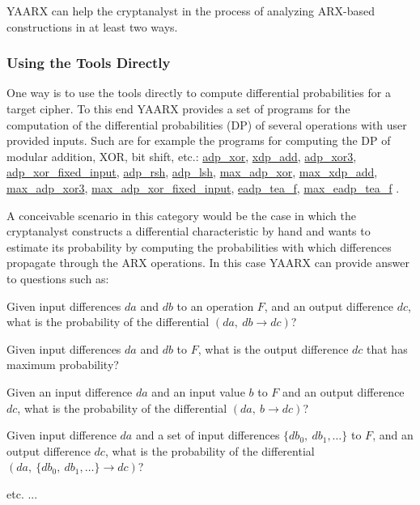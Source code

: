 \-Y\-A\-A\-R\-X can help the cryptanalyst in the process of analyzing \-A\-R\-X-\/based constructions in at least two ways.\hypertarget{index_scenario1_sec}{}\subsubsection{\-Using the Tools Directly}\label{index_scenario1_sec}
\-One way is to use the tools directly to compute differential probabilities for a target cipher. \-To this end \-Y\-A\-A\-R\-X provides a set of programs for the computation of the differential probabilities (\-D\-P) of several operations with user provided inputs. \-Such are for example the programs for computing the \-D\-P of modular addition, \-X\-O\-R, bit shift, etc.\-: \hyperlink{adp-xor_8hh_ac720722a292fc8bb277b751e0b0be072}{adp\-\_\-xor}, \hyperlink{xdp-add_8hh_a25473697bd215fe5eb997574be30e6f3}{xdp\-\_\-add}, \hyperlink{adp-xor3_8hh_a980a22f6faf155e031f0d9f7e8ca9361}{adp\-\_\-xor3}, \hyperlink{adp-xor-fi_8hh_a99d9ef4f2707e61bbd739aa41c93dcb4}{adp\-\_\-xor\-\_\-fixed\-\_\-input}, \hyperlink{adp-shift_8hh_a06fffd781af6662482922889bc562caf}{adp\-\_\-rsh}, \hyperlink{adp-shift_8hh_a48f94900b0d370c44ef16256310d073f}{adp\-\_\-lsh}, \hyperlink{max-adp-xor_8hh_aa66f59ae4d29988f90f525ce600d6045}{max\-\_\-adp\-\_\-xor}, \hyperlink{max-xdp-add_8hh_a19d57935afe7dabc0628a3ea44c1f135}{max\-\_\-xdp\-\_\-add}, \hyperlink{max-adp-xor3_8hh_aa606808c54de33ad16170106454312a7}{max\-\_\-adp\-\_\-xor3}, \hyperlink{max-adp-xor-fi_8hh_ab2a3ba6507c5a4b456487c3f8009511b}{max\-\_\-adp\-\_\-xor\-\_\-fixed\-\_\-input}, \hyperlink{eadp-tea-f_8hh_a2b46cad5e0dd22f116160ef8fde6e15f}{eadp\-\_\-tea\-\_\-f}, \hyperlink{eadp-tea-f_8hh_afecdbe906e7af3483f251d65512f85f7}{max\-\_\-eadp\-\_\-tea\-\_\-f} .

\-A conceivable scenario in this category would be the case in which the cryptanalyst constructs a differential characteristic by hand and wants to estimate its probability by computing the probabilities with which differences propagate through the \-A\-R\-X operations. \-In this case \-Y\-A\-A\-R\-X can provide answer to questions such as\-:


\begin{DoxyItemize}
\item \-Given input differences $da$ and $db$ to an operation $F$, and an output difference $dc$, what is the probability of the differential $(da,~ db \rightarrow dc)$?  
\item \-Given input differences $da$ and $db$ to $F$, what is the output difference $dc$ that has maximum probability?  
\item \-Given an input difference $da$ and an input value $b$ to $F$ and an output difference $dc$, what is the probability of the differential $(da,~ b \rightarrow dc)$?  
\item \-Given input difference $da$ and a set of input differences $\{db_0,~db_1,\ldots\}$ to $F$, and an output difference $dc$, what is the probability of the differential $(da,~ \{db_0,~db_1,\ldots\} \rightarrow dc)$?  
\item etc. ...  
\end{DoxyItemize}

